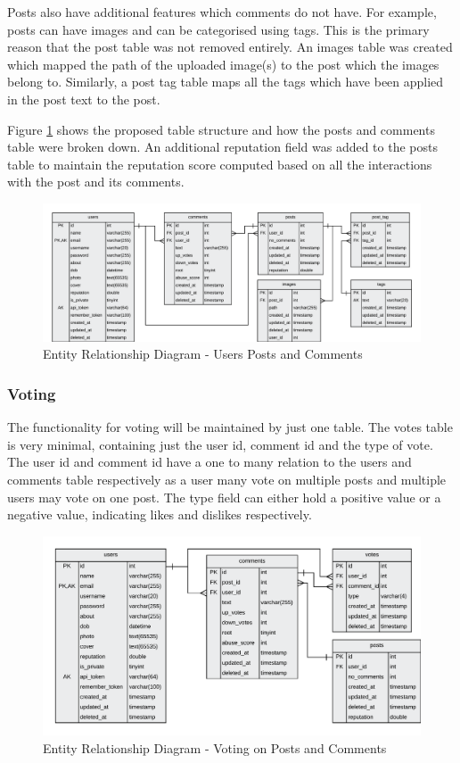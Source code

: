 Posts also have additional features which comments do not have. For example, posts can have images and can be categorised using tags. This is the primary reason that the post table was not removed entirely. An images table was created which mapped the path of the uploaded image(s) to the post which the images belong to. Similarly, a post tag table maps all the tags which have been applied in the post text to the post.

Figure \ref{fig:ERD_Posts} shows the proposed table structure and how the posts and comments table were broken down. An additional reputation field was added to the posts table to maintain the reputation score computed based on all the interactions with the post and its comments.

\begin{figure}[H]
  \centering
  \includegraphics[width=1.0\textwidth]{Images/Design/Database/Posts}
  \caption{Entity Relationship Diagram - Users Posts and Comments} \label{fig:ERD_Posts}
\end{figure}

\subsubsection{Voting}
The functionality for voting will be maintained by just one table. The votes table is very minimal, containing just the user id, comment id and the type of vote. The user id and comment id have a one to many relation to the users and comments table respectively as a user many vote on multiple posts and multiple users may vote on one post. The type field can either hold a positive value or a negative value, indicating likes and dislikes respectively.

\begin{figure}[H]
  \centering
  \includegraphics[width=1.0\textwidth]{Images/Design/Database/Votes}
  \caption{Entity Relationship Diagram - Voting on Posts and Comments} \label{fig:ERD_Voting}
\end{figure}

